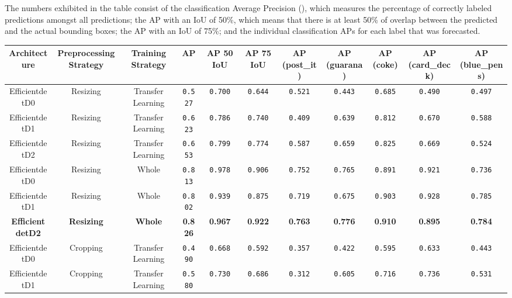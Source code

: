 \documentclass[openright]{normas-utf-tex} %
\begin{document}
The numbers exhibited in the table consist of the classification Average Precision 
(), which measures the percentage of correctly labeled 
predictions amongst all predictions; the AP with an IoU of 50\%, which means that
there is at least 50\% of overlap between the predicted and the actual bounding boxes; 
the AP with an IoU of 75\%; and the individual classification APs for each label that 
was forecasted. 

\begin{table}[H]
	\label{tab:modelPerformance}
	\centering
	\begin{adjustbox}{width=1\textwidth}
	\begin{tabular}{c|c|c|c|c|c|c|c|c|c|c}
		\hline 
		Architecture & Preprocessing Strategy & Training Strategy & AP & AP 50 IoU & AP 75 IoU & AP (post\_it) & AP (guarana) & AP (coke) & AP (card\_deck) & AP (blue\_pens) \\
		\hline
        Efficientdet\-D0 & Resizing & Transfer Learning & \texttt{0.527} & \texttt{0.700} & \texttt{0.644} & \texttt{0.521} & \texttt{0.443} & \texttt{0.685} & \texttt{0.490} & \texttt{0.497} \\
		Efficientdet\-D1 & Resizing & Transfer Learning & \texttt{0.623} & \texttt{0.786} & \texttt{0.740} & \texttt{0.409} & \texttt{0.639} & \texttt{0.812} & \texttt{0.670} & \texttt{0.588} \\
		Efficientdet\-D2 & Resizing & Transfer Learning & \texttt{0.653} & \texttt{0.799} & \texttt{0.774} & \texttt{0.587} & \texttt{0.659} & \texttt{0.825} & \texttt{0.669} & \texttt{0.524} \\
		Efficientdet\-D0 & Resizing & Whole & \texttt{0.813} & \texttt{0.978} & \texttt{0.906} & \texttt{0.752} & \texttt{0.765} & \texttt{0.891} & \texttt{0.921} & \texttt{0.736} \\
		Efficientdet\-D1 & Resizing & Whole & \texttt{0.802} & \texttt{0.939} & \texttt{0.875} & \texttt{0.719} & \texttt{0.675} & \texttt{0.903} & \texttt{0.928} & \texttt{0.785} \\
		\textbf{Efficientdet\-D2} & \textbf{Resizing} & \textbf{Whole} & \textbf{0.826} & \textbf{0.967} & \textbf{0.922} & \textbf{0.763} & \textbf{0.776} & \textbf{0.910} & \textbf{0.895} & \textbf{0.784} \\
		Efficientdet\-D0 & Cropping & Transfer Learning & \texttt{0.490} & \texttt{0.668} & \texttt{0.592} & \texttt{0.357} & \texttt{0.422} & \texttt{0.595} & \texttt{0.633} & \texttt{0.443} \\
		Efficientdet\-D1 & Cropping & Transfer Learning & \texttt{0.580} & \texttt{0.730} & \texttt{0.686} & \texttt{0.312} & \texttt{0.605} & \texttt{0.716} & \texttt{0.736} & \texttt{0.531} \\

\end{tabular}
\end{adjustbox}
\end{table}
\end{document}
